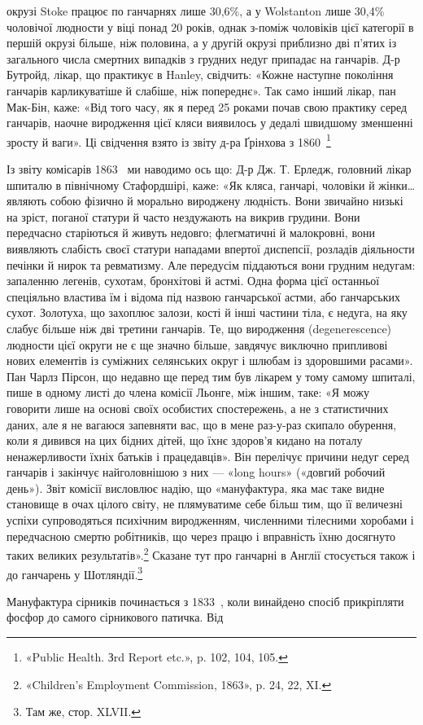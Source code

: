 \parcont{}  %
окрузі Stoke працює по ганчарнях лише 30,6\%, а у Wolstanton
лише 30,4\% чоловічої людности у віці понад 20 років, однак
з-поміж чоловіків цієї категорії в першій окрузі більше, ніж
половина, а у другій окрузі приблизно дві п’ятих із загального
числа смертних випадків з грудних недуг припадає на ганчарів.
Д-р Бутройд, лікар, що практикує в Hanley, свідчить: «Кожне
наступне покоління ганчарів карликуватіше й слабіше, ніж попереднє».
Так само інший лікар, пан Мак-Бін, каже: «Від того
часу, як я перед 25 роками почав свою практику серед ганчарів,
наочне виродження цієї кляси виявилось у дедалі швидшому
зменшенні зросту й ваги». Ці свідчення взято із звіту д-ра
Ґрінхова з 1860~\footnote{
«Public Health. Зrd Report etc.», p. 102, 104, 105.
}

Із звіту комісарів 1863~ ми наводимо ось що: Д-р Дж.
Т. Ерледж, головний лікар шпиталю в північному Стафордшірі,
каже: «Як кляса, ганчарі, чоловіки й жінки\dots{} являють собою
фізично й морально вироджену людність. Вони звичайно низькі
на зріст, поганої статури й часто нездужають на викрив грудини.
Вони передчасно старіються й живуть недовго; флегматичні й
малокровні, вони виявляють слабість своєї статури нападами
впертої диспепсії, розладів діяльности печінки й нирок та ревматизму.
Але передусім піддаються вони грудним недугам: запаленню
легенів, сухотам, бронхітові й астмі. Одна форма цієї
останньої спеціяльно властива їм і відома під назвою ганчарської
астми, або ганчарських сухот. Золотуха, що захоплює залози,
кості й інші частини тіла, є недуга, на яку слабує більше ніж
дві третини ганчарів. Те, що виродження (degenerescence) людности
цієї округи не є ще значно більше, завдячує виключно
припливові нових елементів із суміжних селянських округ і
шлюбам із здоровшими расами». Пан Чарлз Пірсон, що недавно
ще перед тим був лікарем у тому самому шпиталі, пише
в одному листі до члена комісії Льонге, між іншим, таке: «Я можу
говорити лише на основі своїх особистих спостережень, а не з
статистичних даних, але я не вагаюся запевняти вас, що в мене
раз-у-раз скипало обурення, коли я дивився на цих бідних
дітей, що їхнє здоров’я кидано на поталу ненажерливости їхніх
батьків і працедавців». Він перелічує причини недуг серед ганчарів
і закінчує найголовнішою з них — «long hours» («довгий
робочий день»). Звіт комісії висловлює надію, що «мануфактура,
яка має таке видне становище в очах цілого світу, не плямуватиме
себе більш тим, що її величезні успіхи супроводяться психічним
виродженням, численними тілесними хоробами і передчасною
смертю робітників, що через працю і вправність їхню
досягнуто таких великих результатів».\footnote{
«Children’s Employment Commission, 1863», p. 24, 22, XI.
} Сказане тут про ганчарні
в Англії стосується також і до ганчарень у Шотляндії.\footnote{
Там же, стор. XLVII.
}

Мануфактура сірників починається з 1833~, коли винайдено
спосіб прикріпляти фосфор до самого сірникового патичка. Від
\parbreak{}  %
